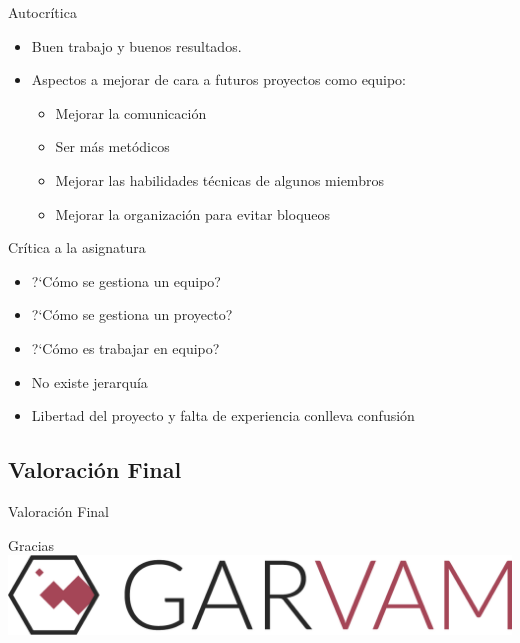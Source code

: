 \documentclass{beamer}
\begin{document}
\begin{frame}{Autocr\'itica}
  \begin{itemize}
  \item { Buen trabajo y buenos resultados. }
  \item { Aspectos a mejorar de cara a futuros proyectos como equipo:
    \begin{itemize}
    \item {Mejorar la comunicaci\'on}
    \item {Ser m\'as met\'odicos}
    \item {Mejorar las habilidades t\'ecnicas de algunos miembros}
    \item {Mejorar la organizaci\'on para evitar bloqueos}
    \end{itemize}
  }
  \end{itemize}
\end{frame}

\begin{frame}{Cr\'itica a la asignatura}
  \begin{itemize}
  \item { ?`C\'omo se gestiona un equipo?}
  \item { ?`C\'omo se gestiona un proyecto?}
  \item {?`C\'omo es trabajar en equipo?}
  \end{itemize}
  
    \begin{itemize}
    \item {No existe jerarqu\'ia}
    \item {Libertad del proyecto y falta de experiencia conlleva confusi\'on}
    \end{itemize}
    
\end{frame}

\subsection{Valoraci\'on Final}

\begin{frame}{Valoraci\'on Final}

\end{frame}

\begin{frame}{Gracias}
	\centering
	\includegraphics[width=0.6\paperwidth, height = 0.2\paperheight]{images_latex/logo}
\end{frame}
\end{document}

